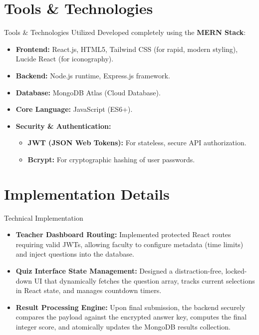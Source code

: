 \documentclass[aspectratio=169, 11pt]{beamer}
\begin{document}
\section{Tools \& Technologies}
\begin{frame}{Tools \& Technologies Utilized}
    Developed completely using the \textbf{MERN Stack}:
    \vspace{0.3cm}
    \begin{itemize}
        \item \textbf{Frontend:} React.js, HTML5, Tailwind CSS (for rapid, modern styling), Lucide React (for iconography).
        \item \textbf{Backend:} Node.js runtime, Express.js framework.
        \item \textbf{Database:} MongoDB Atlas (Cloud Database).
        \item \textbf{Core Language:} JavaScript (ES6+).
        \item \textbf{Security \& Authentication:} 
        \begin{itemize}
            \item \textbf{JWT (JSON Web Tokens):} For stateless, secure API authorization.
            \item \textbf{Bcrypt:} For cryptographic hashing of user passwords.
        \end{itemize}
    \end{itemize}
\end{frame}

\section{Implementation Details}
\begin{frame}{Technical Implementation}
    \begin{itemize}
        \item \textbf{Teacher Dashboard Routing:} Implemented protected React routes requiring valid JWTs, allowing faculty to configure metadata (time limits) and inject questions into the database.
        \item \textbf{Quiz Interface State Management:} Designed a distraction-free, locked-down UI that dynamically fetches the question array, tracks current selections in React state, and manages countdown timers.
        \item \textbf{Result Processing Engine:} Upon final submission, the backend securely compares the payload against the encrypted answer key, computes the final integer score, and atomically updates the MongoDB results collection.
    \end{itemize}
\end{frame}
\end{document}
